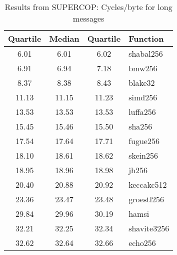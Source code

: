 \begin{table}
  \centering
  \caption{Results from SUPERCOP: Cycles/byte for long messages}
  \begin{tabular}{ | c | c | c | l | }
    \hline
    \textbf{Quartile} & \textbf{Median} & \textbf{Quartile} & \textbf{Function} \\ \hline
    6.01 & 6.01 & 6.02 & shabal256 \\ \hline
    6.91 & 6.94 & 7.18 & bmw256 \\ \hline
    8.37 & 8.38 & 8.43 & blake32 \\ \hline
    11.13 & 11.15 & 11.23 & simd256 \\ \hline
    13.53 & 13.53 & 13.53 & luffa256 \\ \hline
    15.45 & 15.46 & 15.50 & sha256 \\ \hline
    17.54 & 17.64 & 17.71 & fugue256 \\ \hline
    18.10 & 18.61 & 18.62 & skein256 \\ \hline
    18.95 & 18.96 & 18.98 & jh256 \\ \hline
    20.40 & 20.88 & 20.92 & keccakc512 \\ \hline
    23.36 & 23.47 & 23.48 & groestl256 \\ \hline
    29.84 & 29.96 & 30.19 & hamsi \\ \hline
    32.21 & 32.25 & 32.34 & shavite3256 \\ \hline
    32.62 & 32.64 & 32.66 & echo256 \\ \hline
  \end{tabular}
  \label{tbl:supercop:long}
\end{table}
